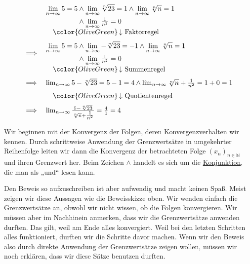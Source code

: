 \documentclass[fontsize=9pt,
               parskip=half-,
               DIV=14,
               listof=chapterentry,
               tocflat]{scrbook}
\begin{document}
\begin{align*}
{\begin{array}{ll}&{\begin{aligned}\lim _{n\rightarrow \infty }5=5&\land \lim _{n\rightarrow \infty }{\sqrt[{n}]{23}}=1\land \lim _{n\rightarrow \infty }{\sqrt[{n}]{n}}=1\\[0.3em]&\land \lim _{n\rightarrow \infty }{\tfrac {1}{n^{2}}}=0\end{aligned}}\\[0.7em]&\quad {\color {OliveGreen}\left\downarrow \ {\text{Faktorregel}}\right.}\\[0.7em]\implies &{\begin{aligned}\lim _{n\rightarrow \infty }5=5&\land \lim _{n\rightarrow \infty }-{\sqrt[{n}]{23}}=-1\land \lim _{n\rightarrow \infty }{\sqrt[{n}]{n}}=1\\[0.3em]&\land \lim _{n\rightarrow \infty }{\tfrac {1}{n^{2}}}=0\end{aligned}}\\[0.7em]&\quad {\color {OliveGreen}\left\downarrow \ {\text{Summenregel}}\right.}\\[0.7em]\implies &\lim _{n\rightarrow \infty }5-{\sqrt[{n}]{23}}=5-1=4\land \lim _{n\rightarrow \infty }{\sqrt[{n}]{n}}+{\tfrac {1}{n^{2}}}=1+0=1\\[0.7em]&\quad {\color {OliveGreen}\left\downarrow \ {\text{Quotientenregel}}\right.}\\[0.7em]\implies &\lim _{n\rightarrow \infty }{\frac {5-{\sqrt[{n}]{23}}}{{\sqrt[{n}]{n}}+{\tfrac {1}{n^{2}}}}}={\frac {4}{1}}=4\end{array}}
\end{align*}

Wir beginnen mit der Konvergenz der Folgen, deren Konvergenzverhalten wir kennen. Durch schrittweise Anwendung der Grenzwertsätze in umgekehrter Reihenfolge leiten wir dann die Konvergenz der betrachteten Folge $(x_{n})_{n\in \mathbb {N} }$ und ihren Grenzwert her. Beim Zeichen $\land $ handelt es sich um die \href{https://de.wikibooks.org/wiki/Mathe\_für\_Nicht-Freaks:\_Junktor\#Anker:Konjunktion}
{Konjunktion}, die man als „und“ lesen kann.

Den Beweis so aufzuschreiben ist aber aufwendig und macht keinen Spaß. Meist zeigen wir diese Aussagen wie die Beweisskizze oben. Wir wenden einfach die Grenzwertsätze an, obwohl wir nicht wissen, ob die Folgen konvergieren. Wir müssen aber im Nachhinein anmerken, dass wir die Grenzwertsätze anwenden durften. Das gilt, weil am Ende alles konvergiert. Weil bei den letzten Schritten alles funktioniert, durften wir die Schritte davor machen. Wenn wir den Beweis also durch direkte Anwendung der Grenzwertsätze zeigen wollen, müssen wir noch erklären, dass wir diese Sätze benutzen durften.
\end{document}
